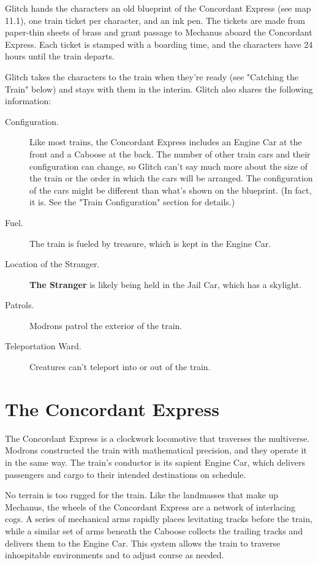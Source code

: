 \documentclass[10pt,a4paper,twoside,bg=print,twocolumn,openany,nodeprecatedcode]{dndbook}
\begin{document}
Glitch hands the characters an old blueprint of the Concordant Express (see map 11.1), one train ticket per character, and an ink pen. The tickets are made from paper-thin sheets of brass and grant passage to Mechanus aboard the Concordant Express. Each ticket is stamped with a boarding time, and the characters have 24 hours until the train departs.

Glitch takes the characters to the train when they're ready (see "Catching the Train" below) and stays with them in the interim. Glitch also shares the following information:


\begin{description}
\item[Configuration.]
Like most trains, the Concordant Express includes an Engine Car at the front and a Caboose at the back. The number of other train cars and their configuration can change, so Glitch can't say much more about the size of the train or the order in which the cars will be arranged. The configuration of the cars might be different than what's shown on the blueprint. (In fact, it is. See the "Train Configuration" section for details.)
\item[Fuel.]
The train is fueled by treasure, which is kept in the Engine Car.
\item[Location of the Stranger.]
\textbf{The Stranger} is likely being held in the Jail Car, which has a skylight.
\item[Patrols.]
Modrons patrol the exterior of the train.
\item[Teleportation Ward.]
Creatures can't teleport into or out of the train.
\end{description}

\section{The Concordant Express}
The Concordant Express is a clockwork locomotive that traverses the multiverse. Modrons constructed the train with mathematical precision, and they operate it in the same way. The train's conductor is its sapient Engine Car, which delivers passengers and cargo to their intended destinations on schedule.

No terrain is too rugged for the train. Like the landmasses that make up Mechanus, the wheels of the Concordant Express are a network of interlacing cogs. A series of mechanical arms rapidly places levitating tracks before the train, while a similar set of arms beneath the Caboose collects the trailing tracks and delivers them to the Engine Car. This system allows the train to traverse inhospitable environments and to adjust course as needed.
\end{document}
